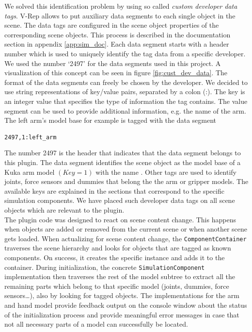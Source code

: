 We solved this identification problem by using so called \emph{custom developer data tags}. V-Rep allows to put auxiliary data segments to each single object in the scene. The data tags are configured in the scene object properties of the corresponding scene objects. This process is described in the documentation section in appendix \ref{app:sim_doc}. Each data segment starts with a header number which is used to uniquely identify the tag data from a specific developer. We used the number `2497' for the data segments used in this project. A visualization of this concept can be seen in figure \ref{fig:cust_dev_data}. The format of the data segments can freely be chosen by the developer. We decided to use string representations of key/value pairs, separated by a colon (:). The key is an integer value that specifies the type of information the tag contains. The value segment can be used to provide additional information, e.g. the name of the arm. The left arm's model base for example is tagged with the data segment 
\begin{center}
\texttt{2497,1:left\_arm}
\end{center}
The number 2497 is the header that indicates that the data segment belongs to this plugin. The data segment identifies the scene object as the model base of a Kuka arm model $(Key=1)$ with the name . Other tags are used to identify joints, force sensors and dummies that belong the the arm or gripper models. The available keys are explained in the sections that correspond to the specific simulation components. We have placed such developer data tags on all scene objects which are relevant to the plugin. \\

The plugin code was designed to react on scene content change. This happens when objects are added or removed from the current scene or when another scene gets loaded. When actualizing for scene content change, the \texttt{ComponentContainer} traverses the scene hierarchy and looks for objects that are tagged as known components. On success, it creates the specific instance and adds it to the container. During initialization, the concrete \texttt{SimulationComponent} implementation then traverses the rest of the model subtree to extract all the remaining parts which belong to that specific model (joints, dummies, force sensors\ldots), also by looking for tagged objects. The implementations for the arm and hand model provide feedback output on the console window about the status of the initialization process and provide meaningful error messages in case that not all necessary parts of a model can successfully be located.


